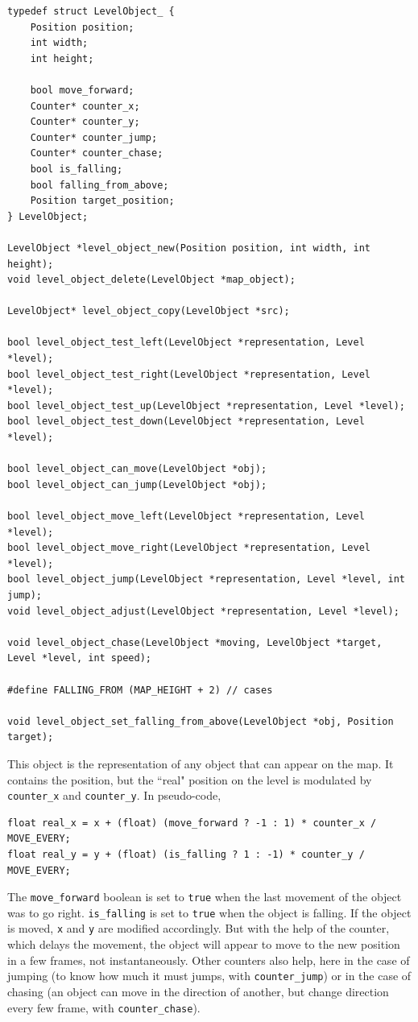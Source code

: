 \documentclass[12pt,a4paper]{article}
\newcommand{\cc}[1]{\texttt{#1}}
\begin{document}
\begin{verbatim}
typedef struct LevelObject_ {
    Position position;
    int width;
    int height;

    bool move_forward;
    Counter* counter_x;
    Counter* counter_y;
    Counter* counter_jump;
    Counter* counter_chase;    
    bool is_falling;
    bool falling_from_above;
    Position target_position;
} LevelObject;

LevelObject *level_object_new(Position position, int width, int height);
void level_object_delete(LevelObject *map_object);

LevelObject* level_object_copy(LevelObject *src);

bool level_object_test_left(LevelObject *representation, Level *level);
bool level_object_test_right(LevelObject *representation, Level *level);
bool level_object_test_up(LevelObject *representation, Level *level);
bool level_object_test_down(LevelObject *representation, Level *level);

bool level_object_can_move(LevelObject *obj);
bool level_object_can_jump(LevelObject *obj);

bool level_object_move_left(LevelObject *representation, Level *level);
bool level_object_move_right(LevelObject *representation, Level *level);
bool level_object_jump(LevelObject *representation, Level *level, int jump);
void level_object_adjust(LevelObject *representation, Level *level);

void level_object_chase(LevelObject *moving, LevelObject *target, Level *level, int speed);

#define FALLING_FROM (MAP_HEIGHT + 2) // cases

void level_object_set_falling_from_above(LevelObject *obj, Position target);
\end{verbatim}

This object is the representation of any object that can appear on the map. It contains the position, but the ``real" position on the level is modulated by \cc{counter_x} and \cc{counter_y}. In pseudo-code,\begin{verbatim}
float real_x = x + (float) (move_forward ? -1 : 1) * counter_x / MOVE_EVERY;
float real_y = y + (float) (is_falling ? 1 : -1) * counter_y / MOVE_EVERY;
\end{verbatim}
The \cc{move_forward} boolean is set to \cc{true} when the last movement of the object was to go right. \cc{is_falling} is set to \cc{true} when the object is falling.
If the object is moved, \cc{x} and \cc{y} are modified accordingly. But with the help of the counter, which delays the movement, the object will appear to move to the new position in a few frames, not instantaneously. Other counters also help, here in the case of jumping (to know how much it must jumps, with \cc{counter_jump}) or in the case of chasing (an object can move in the direction of another, but change direction every few frame, with \cc{counter_chase}).
\end{document}
